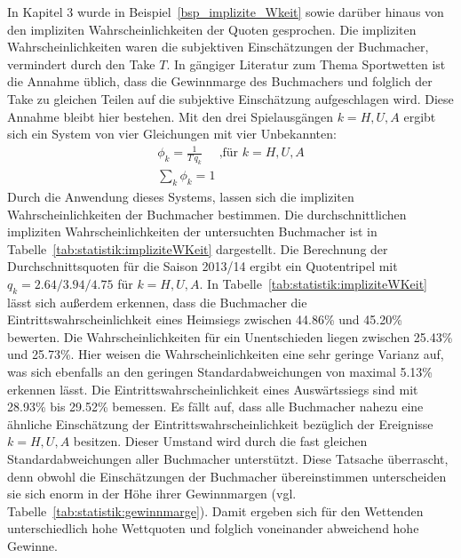 In Kapitel 3 wurde in Beispiel~\ref{bsp_implizite_Wkeit} sowie darüber hinaus von den impliziten Wahrscheinlichkeiten der Quoten gesprochen. Die impliziten Wahrscheinlichkeiten waren die subjektiven Einschätzungen der Buchmacher, vermindert durch den Take $ T $. In gängiger Literatur zum Thema Sportwetten ist die Annahme üblich, dass die Gewinnmarge des Buchmachers und folglich der Take zu gleichen Teilen auf die subjektive Einschätzung aufgeschlagen wird. Diese Annahme bleibt hier bestehen. Mit den drei Spielausgängen $ k=H,U,A $ ergibt sich ein System von vier Gleichungen mit vier Unbekannten: \begin{align*}
\phi_k = \frac{1}{T \, q_k} \quad \mbox{ ,für } k=H,U,A \\
\sum_{k}^{}{\phi_k} = 1
\end{align*}
Durch die Anwendung dieses Systems, lassen sich die impliziten Wahrscheinlichkeiten der Buchmacher bestimmen. Die durchschnittlichen impliziten Wahrscheinlichkeiten der untersuchten Buchmacher ist in Tabelle~\ref{tab:statistik:impliziteWKeit} dargestellt. Die Berechnung der Durchschnittsquoten für die Saison 2013/14 ergibt ein Quotentripel mit $ q_k = 2.64/3.94/4.75 $ für $ k=H,U,A $. In Tabelle~\ref{tab:statistik:impliziteWKeit} lässt sich außerdem erkennen, dass die Buchmacher die Eintrittswahrscheinlichkeit eines Heimsiegs zwischen 44.86\% und 45.20\% bewerten. Die Wahrscheinlichkeiten für ein Unentschieden liegen zwischen 25.43\% und 25.73\%. Hier weisen die Wahrscheinlichkeiten eine sehr geringe Varianz auf, was sich ebenfalls an den geringen Standardabweichungen von maximal 5.13\% erkennen lässt. Die Eintrittswahrscheinlichkeit eines Auswärtssiegs sind mit 28.93\% bis 29.52\% bemessen. Es fällt auf, dass alle Buchmacher nahezu eine ähnliche Einschätzung der Eintrittswahrscheinlichkeit bezüglich der Ereignisse $ k=H,U,A $ besitzen. Dieser Umstand wird durch die fast gleichen Standardabweichungen aller Buchmacher unterstützt. Diese Tatsache überrascht, denn obwohl die Einschätzungen der Buchmacher übereinstimmen unterscheiden sie sich enorm in der Höhe ihrer Gewinnmargen (vgl. Tabelle~\ref{tab:statistik:gewinnmarge}). Damit ergeben sich für den Wettenden unterschiedlich hohe Wettquoten und folglich voneinander abweichend hohe Gewinne.

